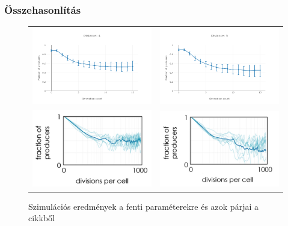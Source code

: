 \begin{frame}
\frametitle{Összehasonlítás}
\begin{figure}[h]
	\centering
	\begin{tabular}{cc}
		\includegraphics[width=0.4\linewidth]{images/dist4}
		&
		\includegraphics[width=0.4\linewidth]{images/dist5}
		\\
		\includegraphics[width=0.4\linewidth]{images/arc_dist4}
		&
		\includegraphics[width=0.4\linewidth]{images/arc_dist5}
		\\
	\end{tabular}
	\caption{Szimulációs eredmények a fenti paraméterekre és azok párjai a \cite{archetti2016cooperation} cikkből}
	\label{fig:DistChange}
\end{figure}
\end{frame}

